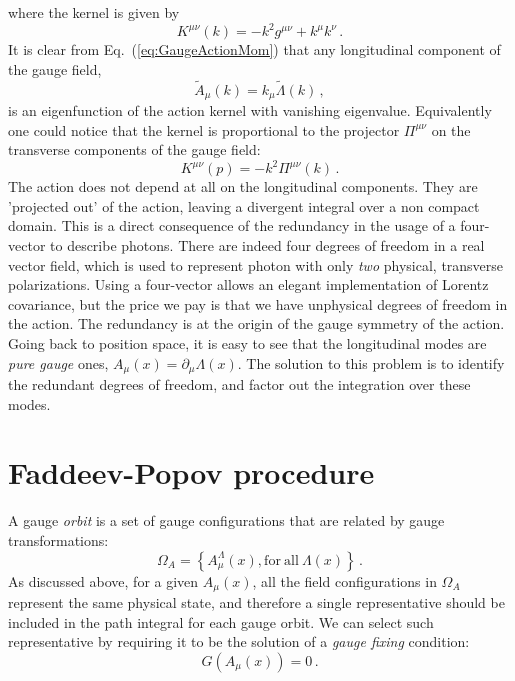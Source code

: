 \documentclass[notes]{subfiles}
\renewcommand{\munu}{{\mu\nu}}
\begin{document}
where the kernel is given by
\begin{equation}
  \label{eq:GaugeKernel}
  K^\munu(k) = -k^2 g^\munu + k^\mu k^\nu\, .
\end{equation}
It is clear from Eq.~(\ref{eq:GaugeActionMom}) that any longitudinal
component of the gauge field, 
\[
\tilde{A}_\mu(k) = k_\mu \tilde{\Lambda}(k)\, ,
\]
is an eigenfunction of the action kernel with vanishing
eigenvalue. Equivalently one could notice that the kernel is
proportional to the projector $\Pi^\munu$ on the transverse components
of the gauge field:
\begin{equation}
  \label{eq:GaugeProj}
  K^\munu(p) = -k^2 \Pi^\munu(k)\, .
\end{equation}
The action does not depend at all on the longitudinal components.
They are 'projected out' of the action, leaving a divergent integral
over a non compact domain. This is a direct consequence of the
redundancy in the usage of a four-vector to describe photons. There
are indeed four degrees of freedom in a real vector field, which is
used to represent photon with only {\em two} physical, transverse
polarizations. Using a four-vector allows an elegant implementation of
Lorentz covariance, but the price we pay is that we have unphysical
degrees of freedom in the action. The redundancy is at the origin of
the gauge symmetry of the action. Going back to position space, it is
easy to see that the longitudinal modes are {\em pure gauge} ones, \ie
$A_\mu(x)=\partial_\mu \Lambda(x)$. The solution to this problem is to
identify the redundant degrees of freedom, and factor out the
integration over these modes. 

\section{Faddeev-Popov procedure}
\label{sec:fadd-popov-proc}

A gauge {\em orbit} is a set of gauge configurations that are related
by gauge transformations: 
\begin{equation}
  \label{eq:GaugeOrbit}
  \Omega_A =\left\{
    A^\Lambda_\mu(x), \mathrm{for\ all}\ \Lambda(x)
    \right\}\, .
\end{equation}
As discussed above, for a given $A_\mu(x)$, all the field
configurations in $\Omega_A$ represent the same physical state, and
therefore a single representative should be included in the path
integral for each gauge orbit. We can select such representative by
requiring it to be the solution of a {\em gauge fixing} condition: 
\begin{equation}
  \label{eq:GaugeFixing}
  G\left(A_\mu(x)\right) = 0\, .
\end{equation}
\end{document}
